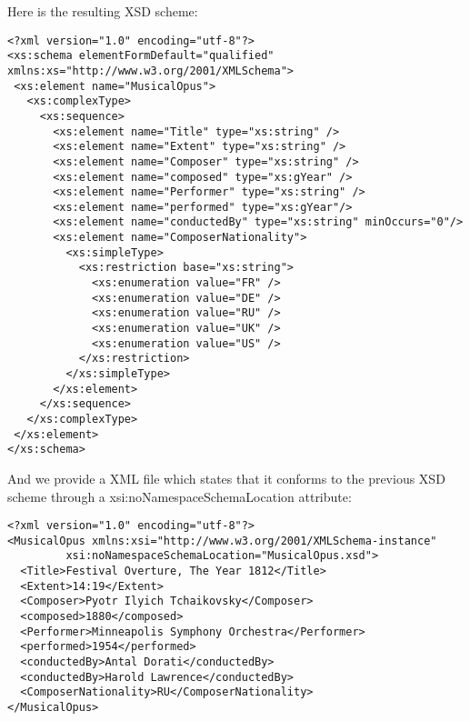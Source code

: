 Here is the resulting XSD scheme:
\begin{Verbatim}[fontsize=\small,formatcom=\color{black!70}]
<?xml version="1.0" encoding="utf-8"?> 
<xs:schema elementFormDefault="qualified"   xmlns:xs="http://www.w3.org/2001/XMLSchema"> 
 <xs:element name="MusicalOpus"> 
   <xs:complexType> 
     <xs:sequence> 
       <xs:element name="Title" type="xs:string" /> 
       <xs:element name="Extent" type="xs:string" /> 
       <xs:element name="Composer" type="xs:string" /> 
       <xs:element name="composed" type="xs:gYear" /> 
       <xs:element name="Performer" type="xs:string" /> 
       <xs:element name="performed" type="xs:gYear"/> 
       <xs:element name="conductedBy" type="xs:string" minOccurs="0"/>  
       <xs:element name="ComposerNationality"> 
         <xs:simpleType> 
           <xs:restriction base="xs:string"> 
             <xs:enumeration value="FR" /> 
             <xs:enumeration value="DE" /> 
             <xs:enumeration value="RU" /> 
             <xs:enumeration value="UK" /> 
             <xs:enumeration value="US" /> 
           </xs:restriction> 
         </xs:simpleType> 
       </xs:element> 
     </xs:sequence> 
   </xs:complexType> 
 </xs:element> 
</xs:schema> 
\end{Verbatim}


And we provide a XML file which states that it conforms to the previous XSD scheme through a xsi:noNamespaceSchemaLocation attribute:
\begin{Verbatim}[fontsize=\small,formatcom=\color{black!70}]
<?xml version="1.0" encoding="utf-8"?> 
<MusicalOpus xmlns:xsi="http://www.w3.org/2001/XMLSchema-instance" 
         xsi:noNamespaceSchemaLocation="MusicalOpus.xsd"> 
  <Title>Festival Overture, The Year 1812</Title> 
  <Extent>14:19</Extent> 
  <Composer>Pyotr Ilyich Tchaikovsky</Composer> 
  <composed>1880</composed> 
  <Performer>Minneapolis Symphony Orchestra</Performer> 
  <performed>1954</performed> 
  <conductedBy>Antal Dorati</conductedBy> 
  <conductedBy>Harold Lawrence</conductedBy> 
  <ComposerNationality>RU</ComposerNationality> 
</MusicalOpus> 
\end{Verbatim}






















